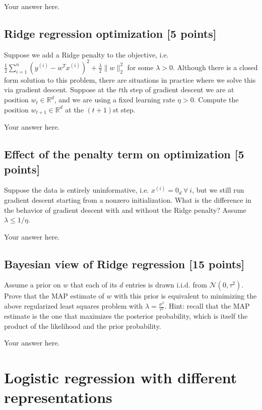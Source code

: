 \documentclass[a4paper]{article}
\theoremstyle{definition}
\begin{document}
	{\color{blue}
			Your answer here.
	}
	
\subsection{Ridge regression optimization [5 points]}
	Suppose we add a Ridge penalty to the objective, i.e. $\frac{1}{2}\sum\limits_{i=1}^n (y^{(i)}-w^Tx^{(i)})^2+\frac\lambda2\|w\|_2^2$ for some $\lambda>0$.
	Although there is a closed form solution to this problem, there are situations in practice where we solve this via gradient descent.
	Suppose at the $t$th step of gradient descent we are at position $w_t\in\mathbb R^d$, and we are using a fixed learning rate $\eta>0$.
	Compute the position $w_{t+1}\in\mathbb{R}^d$ at the $(t+1)$st step.
	
	{\color{blue}
			Your answer here.
	}

\subsection{Effect of the penalty term on optimization [5 points]}

Suppose the data is entirely uninformative, i.e. $x^{(i)}=0_d~\forall~i$, but we still run gradient descent starting from a nonzero initialization. What is the difference in the behavior of gradient descent with and without the Ridge penalty?
Assume $\lambda\le1/\eta$.

{\color{blue}
		Your answer here.
}
	
\subsection{Bayesian view of Ridge regression [15 points]}
	Assume a prior on $w$ that each of its $d$ entries is drawn i.i.d. from $\mathcal N(0,\tau^2)$.
	Prove that the MAP estimate of $w$ with this prior is equivalent to minimizing the above regularized least squares problem with $\lambda = \frac{\sigma^2}{\tau^2}$.  
	Hint: recall that the MAP estimate is the one that maximizes the posterior probability, which is itself the product of the likelihood and the prior probability.
	
	{\color{blue}
			Your answer here.
	}

\newpage
\section{Logistic regression with different representations}
\end{document}
